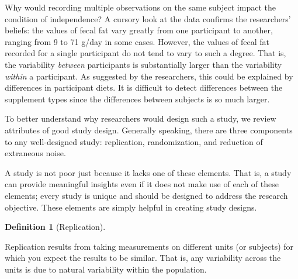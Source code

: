 \documentclass[
  letterpaper,
  DIV=11,
  numbers=noendperiod]{scrreprt}
\theoremstyle{definition}
\newtheorem{definition}{Definition}[chapter]
\theoremstyle{definition}
\theoremstyle{remark}
\begin{document}
Why would recording multiple observations on the same subject impact the
condition of independence? A cursory look at the data confirms the
researchers' beliefs: the values of fecal fat vary greatly from one
participant to another, ranging from 9 to 71 g/day in some cases.
However, the values of fecal fat recorded for a single participant do
not tend to vary to such a degree. That is, the variability
\emph{between} participants is substantially larger than the variability
\emph{within} a participant. As suggested by the researchers, this could
be explained by differences in participant diets. It is difficult to
detect differences between the supplement types since the differences
between subjects is so much larger.

To better understand why researchers would design such a study, we
review attributes of good study design. Generally speaking, there are
three components to any well-designed study: replication, randomization,
and reduction of extraneous noise.

\begin{tcolorbox}[enhanced jigsaw, left=2mm, toprule=.15mm, arc=.35mm, breakable, opacitybacktitle=0.6, opacityback=0, rightrule=.15mm, colbacktitle=quarto-callout-warning-color!10!white, coltitle=black, leftrule=.75mm, toptitle=1mm, colframe=quarto-callout-warning-color-frame, titlerule=0mm, title=\textcolor{quarto-callout-warning-color}{\faExclamationTriangle}\hspace{0.5em}{Warning}, bottomrule=.15mm, colback=white, bottomtitle=1mm]

A study is not poor just because it lacks one of these elements. That
is, a study can provide meaningful insights even if it does not make use
of each of these elements; every study is unique and should be designed
to address the research objective. These elements are simply helpful in
creating study designs.

\end{tcolorbox}

\begin{definition}[Replication]\protect\hypertarget{def-replication}{}\label{def-replication}

Replication results from taking measurements on different units (or
subjects) for which you expect the results to be similar. That is, any
variability across the units is due to natural variability within the
population.

\end{definition}
\end{document}
